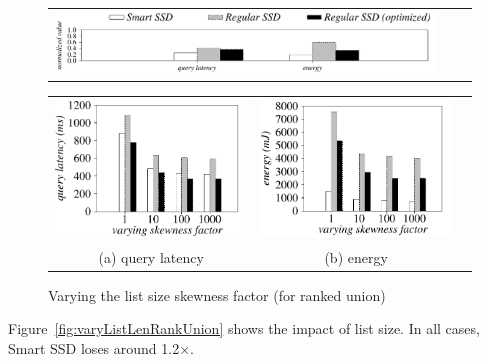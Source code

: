 \begin{figure}[htbp]
  \centering
    \begin{tabular}{ccc}
 \includegraphics[width=0.95\columnwidth]{figures/banner.pdf}%
\end{tabular}
\renewcommand{\tabcolsep}{0.1mm}


  \begin{tabular}{ccc}
 \includegraphics[width=0.5\columnwidth]{figures/RankUnion-time-VaryListSkew-eps-converted-to.pdf}&
  \includegraphics[width=0.5\columnwidth]{figures/RankUnion-energy-VaryListSkew-eps-converted-to.pdf}\\
  (a) query latency & (b) energy
\end{tabular}

  \caption{Varying the list size skewness factor (for ranked union)}
  \label{fig:varyListSkewRankUnion}
 \end{figure}


Figure~\ref{fig:varyListLenRankUnion} shows the impact of list size. In all cases, Smart SSD loses around 1.2$\times$.

